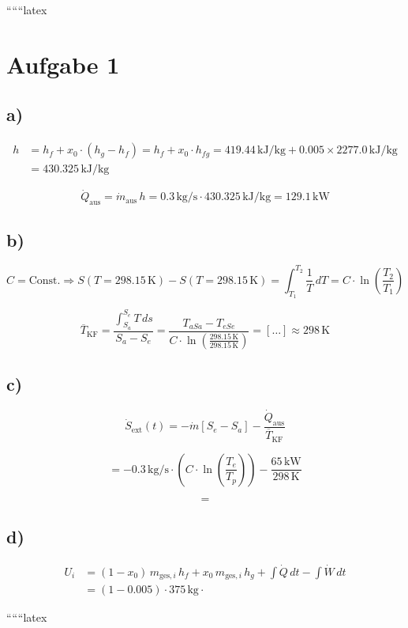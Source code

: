 
``````latex


\section*{Aufgabe 1}

\subsection*{a)}
\begin{align*}
h &= h_f + x_0 \cdot (h_g - h_f) = h_f + x_0 \cdot h_{fg} = 419.44 \, \text{kJ/kg} + 0.005 \times 2277.0 \, \text{kJ/kg} \\
&= 430.325 \, \text{kJ/kg}
\end{align*}

\[
\dot{Q}_{\text{aus}} = \dot{m}_{\text{aus}} \, h = 0.3 \, \text{kg/s} \cdot 430.325 \, \text{kJ/kg} = 129.1 \, \text{kW}
\]

\subsection*{b)}
\[
C = \text{Const.} \Rightarrow S(T = 298.15 \, \text{K}) - S(T = 298.15 \, \text{K}) = \int_{T_1}^{T_2} \frac{1}{T} \, dT = C \cdot \ln \left( \frac{T_2}{T_1} \right)
\]

\[
\overline{T}_{\text{KF}} = \frac{\int_{S_a}^{S_e} T \, ds}{S_a - S_e} = \frac{T_{aSa} - T_{eSe}}{C \cdot \ln \left( \frac{298.15 \, \text{K}}{298.15 \, \text{K}} \right)} = \left[ \ldots \right] \approx 298 \, \text{K}
\]

\subsection*{c)}
\[
\dot{S}_{\text{ext}}(t) = -\dot{m} \left[ S_e - S_a \right] - \frac{\dot{Q}_{\text{aus}}}{\overline{T}_{\text{KF}}}
\]

\[
= -0.3 \, \text{kg/s} \cdot \left( C \cdot \ln \left( \frac{T_e}{T_p} \right) \right) - \frac{65 \, \text{kW}}{298 \, \text{K}}
\]

\[
=
\]

\subsection*{d)}
\begin{align*}
U_i &= (1 - x_0) \, m_{\text{ges},i} \, h_f + x_0 \, m_{\text{ges},i} \, h_g + \int \dot{Q} \, dt - \int \dot{W} \, dt \\
&= (1 - 0.005) \cdot 375 \, \text{kg} \cdot
\end{align*}

``````latex


